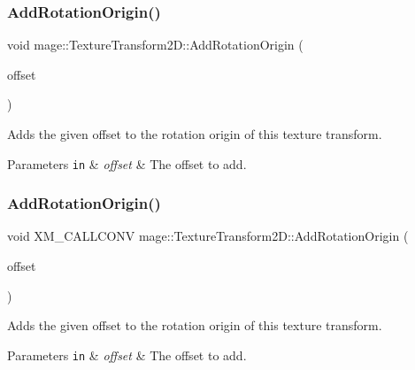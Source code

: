 \subsubsection{\texorpdfstring{Add\+Rotation\+Origin()}{AddRotationOrigin()}\hspace{0.1cm}{\footnotesize\ttfamily [2/3]}}
{\footnotesize\ttfamily void mage\+::\+Texture\+Transform2\+D\+::\+Add\+Rotation\+Origin (\begin{DoxyParamCaption}\item[{const \mbox{\hyperlink{namespacemage_aee4759dedc8def6c6dec26b5c7eddf29}{F32x2}} \&}]{offset }\end{DoxyParamCaption})\hspace{0.3cm}{\ttfamily [noexcept]}}

Adds the given offset to the rotation origin of this texture transform.


\begin{DoxyParams}[1]{Parameters}
\mbox{\tt in}  & {\em offset} & The offset to add. \\
\hline
\end{DoxyParams}
\mbox{\label{classmage_1_1_texture_transform2_d_abb0c58bde2e3e81f87cf693e339daab8}} 
\subsubsection{\texorpdfstring{Add\+Rotation\+Origin()}{AddRotationOrigin()}\hspace{0.1cm}{\footnotesize\ttfamily [3/3]}}
{\footnotesize\ttfamily void X\+M\+\_\+\+C\+A\+L\+L\+C\+O\+NV mage\+::\+Texture\+Transform2\+D\+::\+Add\+Rotation\+Origin (\begin{DoxyParamCaption}\item[{F\+X\+M\+V\+E\+C\+T\+OR}]{offset }\end{DoxyParamCaption})\hspace{0.3cm}{\ttfamily [noexcept]}}

Adds the given offset to the rotation origin of this texture transform.


\begin{DoxyParams}[1]{Parameters}
\mbox{\tt in}  & {\em offset} & The offset to add. \\
\hline
\end{DoxyParams}
\mbox{\label{classmage_1_1_texture_transform2_d_abe5c859c43e15124fda9d038bb7111a3}} 
